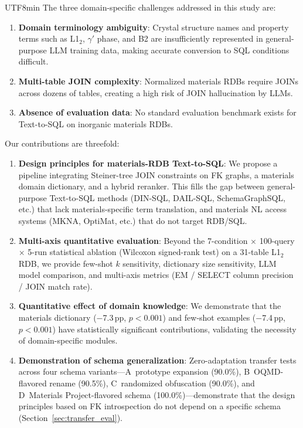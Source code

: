 \documentclass[sn-mathphys,Numbered]{sn-jnl}
\begin{document}
\begin{CJK}{UTF8}{min}
The three domain-specific challenges addressed in this study are:
\begin{enumerate}
  \item \textbf{Domain terminology ambiguity}:
    Crystal structure names and property terms such as
    L1$_2$, $\gamma'$ phase, and B2 are insufficiently represented
    in general-purpose LLM training data,
    making accurate conversion to SQL conditions difficult.
  \item \textbf{Multi-table JOIN complexity}:
    Normalized materials RDBs require JOINs across dozens of tables,
    creating a high risk of JOIN hallucination by LLMs.
  \item \textbf{Absence of evaluation data}:
    No standard evaluation benchmark exists for Text-to-SQL
    on inorganic materials RDBs.
\end{enumerate}

Our contributions are threefold:
\begin{enumerate}[label=(\roman*)]
  \item \textbf{Design principles for materials-RDB Text-to-SQL}:
    We propose a pipeline integrating Steiner-tree JOIN constraints
    on FK graphs, a materials domain dictionary, and a hybrid reranker.
    This fills the gap between general-purpose Text-to-SQL methods
    (DIN-SQL, DAIL-SQL, SchemaGraphSQL, etc.) that lack
    materials-specific term translation,
    and materials NL access systems (MKNA, OptiMat, etc.)
    that do not target RDB/SQL.
  \item \textbf{Multi-axis quantitative evaluation}:
    Beyond the 7-condition $\times$ 100-query $\times$ 5-run
    statistical ablation (Wilcoxon signed-rank test)
    on a 31-table L1$_2$ RDB,
    we provide few-shot $k$ sensitivity, dictionary size sensitivity,
    LLM model comparison, and multi-axis metrics
    (EM / SELECT column precision / JOIN match rate).
  \item \textbf{Quantitative effect of domain knowledge}:
    We demonstrate that the materials dictionary ($-$7.3\,pp, $p<0.001$)
    and few-shot examples ($-$7.4\,pp, $p<0.001$)
    have statistically significant contributions,
    validating the necessity of domain-specific modules.
  \item \textbf{Demonstration of schema generalization}:
    Zero-adaptation transfer tests across four schema variants---A~prototype expansion (90.0\%), B~OQMD-flavored rename (90.5\%), C~randomized obfuscation (90.0\%), and D~Materials Project-flavored schema (100.0\%)---demonstrate that the design principles based on FK introspection do not depend on a specific schema (Section~\ref{sec:transfer_eval}).
\end{enumerate}


\end{CJK}
\end{document}

